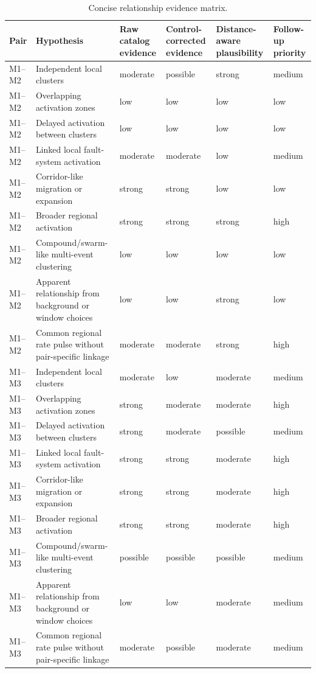 \documentclass[11pt]{article}
\begin{document}
\begin{landscape}
\begin{table}[H]
\centering
\caption{Concise relationship evidence matrix.}
\label{tab:matrix}
\begin{tabularx}{\linewidth}{l l Y Y Y l}
\toprule
Pair & Hypothesis & Raw catalog evidence & Control-corrected evidence & Distance-aware plausibility & Follow-up priority \\
\midrule
M1--M2 & Independent local clusters & moderate & possible & strong & medium \\
M1--M2 & Overlapping activation zones & low & low & low & low \\
M1--M2 & Delayed activation between clusters & low & low & low & low \\
M1--M2 & Linked local fault-system activation & moderate & moderate & low & medium \\
M1--M2 & Corridor-like migration or expansion & strong & strong & low & low \\
M1--M2 & Broader regional activation & strong & strong & strong & high \\
M1--M2 & Compound/swarm-like multi-event clustering & low & low & low & low \\
M1--M2 & Apparent relationship from background or window choices & low & low & strong & low \\
M1--M2 & Common regional rate pulse without pair-specific linkage & moderate & moderate & strong & high \\
\midrule
M1--M3 & Independent local clusters & moderate & low & moderate & medium \\
M1--M3 & Overlapping activation zones & strong & moderate & moderate & high \\
M1--M3 & Delayed activation between clusters & strong & moderate & possible & medium \\
M1--M3 & Linked local fault-system activation & strong & strong & moderate & high \\
M1--M3 & Corridor-like migration or expansion & strong & strong & moderate & high \\
M1--M3 & Broader regional activation & strong & strong & moderate & high \\
M1--M3 & Compound/swarm-like multi-event clustering & possible & possible & possible & medium \\
M1--M3 & Apparent relationship from background or window choices & low & low & moderate & medium \\
M1--M3 & Common regional rate pulse without pair-specific linkage & moderate & possible & moderate & medium \\

\end{tabularx}
\end{table}
\end{landscape}
\end{document}
